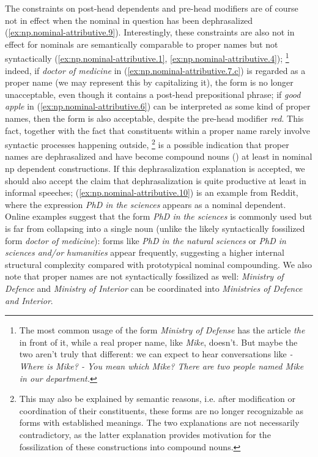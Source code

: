 \documentclass[UTF8, a4paper, oneside, scheme=plain, 12pt]{ctexbook}
\newcommand{\form}[1]{\emph{#1}}
\begin{document}
The constraints on post-head dependents and 
pre-head modifiers 
are of course not in effect 
when the nominal in question has been dephrasalized 
(\ref{ex:np.nominal-attributive.9}).
Interestingly, these constraints are also not in effect 
for nominals are semantically comparable to proper names  
but not syntactically (\ref{ex:np.nominal-attributive.1}, \ref{ex:np.nominal-attributive.4});%
\footnote{
    The most common usage of the form \form{Ministry of Defense} has the article \form{the} in front of it, 
    while a real proper name, like \form{Mike}, doesn't.
    But maybe the two aren't truly that different: 
    we can expect to hear conversations like \form{- Where is Mike? - You mean which Mike? There are two people named Mike in our department.}
}
indeed, if \form{doctor of medicine} in (\ref{ex:np.nominal-attributive.7.c})
is regarded as a proper name (we may represent this by capitalizing it), 
the form is no longer unacceptable, 
even though it contains a post-head prepositional phrase; 
if \form{good apple} in (\ref{ex:np.nominal-attributive.6})
can be interpreted as some kind of proper names, 
then the form is also acceptable, 
despite the pre-head modifier \form{red}. 
This fact, together with the fact that constituents within a proper name 
rarely involve syntactic processes happening outside,%
\footnote{
    This may also be explained by semantic reasons, 
    i.e. after modification or coordination of their constituents, 
    these forms are no longer recognizable 
    as forms with established meanings. 
    The two explanations are not necessarily contradictory, 
    as the latter explanation provides motivation
    for the fossilization of these constructions into compound nouns. 
} 
is a possible indication that proper names are dephrasalized 
and have become compound nouns ()
at least in nominal \acs{np} dependent constructions.
If this dephrasalization explanation is accepted, 
we should also accept the claim that dephrasalization is quite productive at least in informal speeches; 
(\ref{ex:np.nominal-attributive.10}) is an example from Reddit, 
where the expression \form{PhD in the sciences} appears as a nominal dependent.
Online examples suggest that the form \form{PhD in the sciences} is commonly used 
but is far from collapsing into a single noun 
(unlike the likely syntactically fossilized form \form{doctor of medicine}):
forms like \form{PhD in the natural sciences} or \form{PhD in sciences and/or humanities} appear frequently, 
suggesting a higher internal structural complexity compared with prototypical nominal compounding.
We also note that proper names are not syntactically fossilized as well:
\form{Ministry of Defence} and \form{Ministry of Interior}
can be coordinated into \form{Ministries of Defence and Interior}. 
\end{document}
